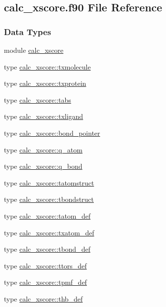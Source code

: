 \hypertarget{calc__xscore_8f90}{\subsection{calc\-\_\-xscore.\-f90 File Reference}
\label{calc__xscore_8f90}
}
\subsubsection*{Data Types}
\begin{DoxyCompactItemize}
\item 
module \hyperlink{classcalc__xscore}{calc\-\_\-xscore}
\item 
type \hyperlink{structcalc__xscore_1_1txmolecule}{calc\-\_\-xscore\-::txmolecule}
\item 
type \hyperlink{structcalc__xscore_1_1txprotein}{calc\-\_\-xscore\-::txprotein}
\item 
type \hyperlink{structcalc__xscore_1_1tabs}{calc\-\_\-xscore\-::tabs}
\item 
type \hyperlink{structcalc__xscore_1_1txligand}{calc\-\_\-xscore\-::txligand}
\item 
type \hyperlink{structcalc__xscore_1_1bond__pointer}{calc\-\_\-xscore\-::bond\-\_\-pointer}
\item 
type \hyperlink{structcalc__xscore_1_1q__atom}{calc\-\_\-xscore\-::q\-\_\-atom}
\item 
type \hyperlink{structcalc__xscore_1_1q__bond}{calc\-\_\-xscore\-::q\-\_\-bond}
\item 
type \hyperlink{structcalc__xscore_1_1tatomstruct}{calc\-\_\-xscore\-::tatomstruct}
\item 
type \hyperlink{structcalc__xscore_1_1tbondstruct}{calc\-\_\-xscore\-::tbondstruct}
\item 
type \hyperlink{structcalc__xscore_1_1tatom__def}{calc\-\_\-xscore\-::tatom\-\_\-def}
\item 
type \hyperlink{structcalc__xscore_1_1txatom__def}{calc\-\_\-xscore\-::txatom\-\_\-def}
\item 
type \hyperlink{structcalc__xscore_1_1tbond__def}{calc\-\_\-xscore\-::tbond\-\_\-def}
\item 
type \hyperlink{structcalc__xscore_1_1ttors__def}{calc\-\_\-xscore\-::ttors\-\_\-def}
\item 
type \hyperlink{structcalc__xscore_1_1tpmf__def}{calc\-\_\-xscore\-::tpmf\-\_\-def}
\item 
type \hyperlink{structcalc__xscore_1_1thb__def}{calc\-\_\-xscore\-::thb\-\_\-def}

\end{DoxyCompactItemize}
